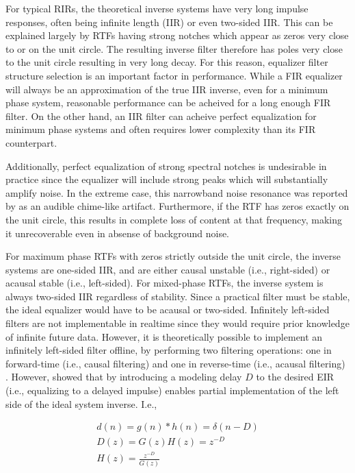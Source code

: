 For typical RIRs, the theoretical inverse systems have very long impulse responses, often being infinite length (IIR) or even two-sided IIR. This can be explained largely by RTFs having strong notches which appear as zeros very close to or on the unit circle. The resulting inverse filter therefore has poles very close to the unit circle resulting in very long decay. For this reason, equalizer filter structure selection is an important factor in performance. While a FIR equalizer will always be an approximation of the true IIR inverse, even for a minimum phase system, reasonable performance can be acheived for a long enough FIR filter. On the other hand, an IIR filter can acheive perfect equalization for minimum phase systems and often requires lower complexity than its FIR counterpart.

Additionally, perfect equalization of strong spectral notches is undesirable in practice since the equalizer will include strong peaks which will substantially amplify noise. In the extreme case, this narrowband noise resonance was reported by \cite{neely1979invertibility} as an audible chime-like artifact. Furthermore, if the RTF has zeros exactly on the unit circle, this results in complete loss of content at that frequency, making it unrecoverable even in absense of background noise.

 For maximum phase RTFs with zeros strictly outside the unit circle, the inverse systems are one-sided IIR, and are either causal unstable (i.e., right-sided) or acausal stable (i.e., left-sided). For mixed-phase RTFs, the inverse system is always two-sided IIR regardless of stability. Since a practical filter must be stable, the ideal equalizer would have to be acausal or two-sided. Infinitely left-sided filters are not implementable in realtime since they would require prior knowledge of infinite future data. However, it is theoretically possible to implement an infinitely left-sided filter offline, by performing two filtering operations: one in forward-time (i.e., causal filtering) and one in reverse-time (i.e., acausal filtering) \citep{kormylo1974twopass}. However, \cite{treitel1966design} showed that by introducing a modeling delay $D$ to the desired EIR (i.e., equalizing to a delayed impulse) enables partial implementation of the left side of the ideal system inverse. I.e., 

\begin{eqnarray}
	d(n)=g(n)*h(n)=\delta(n-D) \\
	D(z)=G(z)H(z)=z^{-D}	\\
	H(z)=\frac{z^{-D}}{G(z)}
\end{eqnarray}

